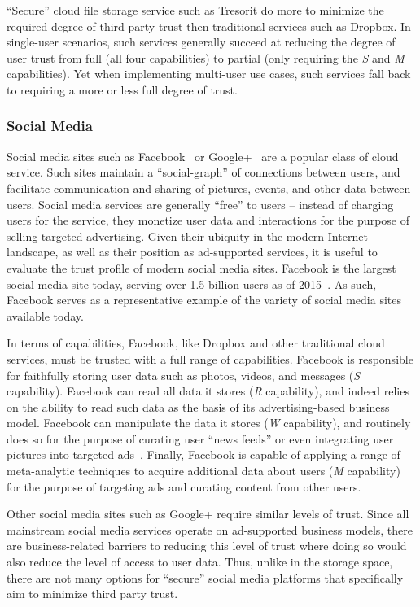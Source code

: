 ``Secure'' cloud file storage service such as Tresorit do more to
minimize the required degree of third party trust then traditional
services such as Dropbox. In single-user scenarios, such services
generally succeed at reducing the degree of user trust from full (all
four capabilities) to partial (only requiring the \emph{S} and
\emph{M} capabilities). Yet when implementing multi-user use cases,
such services fall back to requiring a more or less full degree of
trust.

\subsubsection{Social Media}

Social media sites such as Facebook~\cite{facebook} or
Google+~\cite{google-plus} are a popular class of cloud service. Such
sites maintain a ``social-graph'' of connections between users, and
facilitate communication and sharing of pictures, events, and other
data between users. Social media services are generally ``free'' to
users -- instead of charging users for the service, they monetize user
data and interactions for the purpose of selling targeted
advertising. Given their ubiquity in the modern Internet landscape, as
well as their position as ad-supported services, it is useful to
evaluate the trust profile of modern social media sites. Facebook is
the largest social media site today, serving over 1.5 billion users as
of 2015~\cite{foster2014}. As such, Facebook serves as a
representative example of the variety of social media sites available
today.

In terms of capabilities, Facebook, like Dropbox and other traditional
cloud services, must be trusted with a full range of capabilities.
Facebook is responsible for faithfully storing user data such as
photos, videos, and messages (\emph{S} capability). Facebook can read
all data it stores (\emph{R} capability), and indeed relies on the
ability to read such data as the basis of its advertising-based
business model. Facebook can manipulate the data it stores (\emph{W}
capability), and routinely does so for the purpose of curating user
``news feeds'' or even integrating user pictures into targeted
ads~\cite{mashable-socialads}. Finally, Facebook is capable of
applying a range of meta-analytic techniques to acquire additional
data about users (\emph{M} capability) for the purpose of targeting
ads and curating content from other users.

Other social media sites such as Google+ require similar levels of
trust. Since all mainstream social media services operate on
ad-supported business models, there are business-related barriers to
reducing this level of trust where doing so would also reduce the
level of access to user data. Thus, unlike in the storage space, there
are not many options for ``secure'' social media platforms that
specifically aim to minimize third party trust.

